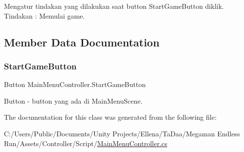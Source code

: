 Mengatur tindakan yang dilakukan saat button Start\+Game\+Button diklik. Tindakan \+: Memulai game. 



\subsection{Member Data Documentation}
\hypertarget{class_main_menu_controller_ac8ee65de25015adeee8ee06dca4ff70a}{}\label{class_main_menu_controller_ac8ee65de25015adeee8ee06dca4ff70a} 
\subsubsection{\texorpdfstring{Start\+Game\+Button}{StartGameButton}}
{\footnotesize\ttfamily Button Main\+Menu\+Controller.\+Start\+Game\+Button}



Button -\/ button yang ada di Main\+Menu\+Scene. 



The documentation for this class was generated from the following file\+:\begin{DoxyCompactItemize}
\item 
C\+:/\+Users/\+Public/\+Documents/\+Unity Projects/\+Ellena/\+Ta\+Daa/\+Megaman Endless Run/\+Assets/\+Controller/\+Script/\hyperlink{_main_menu_controller_8cs}{Main\+Menu\+Controller.\+cs}\end{DoxyCompactItemize}
